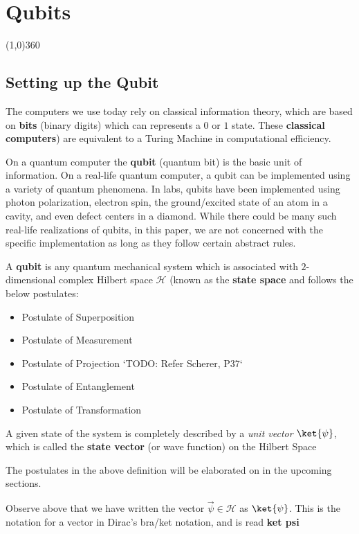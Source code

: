 \chapter{Qubits}
\line(1,0){360} \\
\section{Setting up the Qubit}

The computers we use today rely on classical information theory, which are based on \textbf{bits} (binary digits) which can represents a $0$ or $1$ state. These \textbf{classical computers}) are equivalent to a Turing Machine in computational efficiency. 

On a quantum computer the \textbf{qubit} (quantum bit) is the basic unit of information. On a real-life quantum computer, a qubit can be implemented using a variety of quantum phenomena. In labs, qubits have been implemented using photon polarization, electron spin, the ground/excited state of an atom in a cavity, and even defect centers in a diamond. While there could be many such real-life realizations of qubits, in this paper, we are not concerned with the specific implementation as long as they follow certain abstract rules.

\begin{samepage}
\begin{defn}[Qubit]
A \textbf{qubit} is any quantum mechanical system which is associated with $2$-dimensional complex Hilbert space $\mathcal{H}$ (known as the \textbf{state space} and follows the below postulates:
\begin{itemize}
    \item Postulate of Superposition
    \item Postulate of Measurement
    \item Postulate of Projection `TODO: Refer Scherer, P37`
    \item Postulate of Entanglement
    \item Postulate of Transformation
\end{itemize}
 A given state of the system is completely described by a
 \textit{unit vector} $\ket{\psi}$, which is called the \textbf{state vector} (or wave function) on the Hilbert Space
\end{defn}
The postulates in the above definition will be elaborated on in the upcoming sections.
\end{samepage}

\begin{notation}
    Observe above that we have written the vector $\vec{\psi} \in \mathcal{H}$ as $\ket{\psi}$. This is the notation for a vector in \textnormal{Dirac's bra/ket notation}, and is read \textbf{ket psi}
\end{notation}

